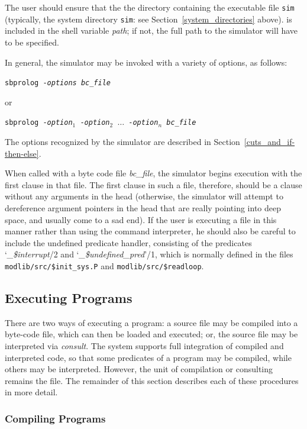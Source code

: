 The user should ensure that the the directory containing the executable file
{\tt sim}
(typically, the system directory {\tt sim}:
see Section~\ref{system_directories} above).
is included in the shell variable {\em path};
if not, the full path to the simulator will have to be specified.

In general, the simulator may be invoked with a variety of options, as
follows:
\begin{center}
{\tt sbprolog -{\em options} {\em bc\_file}}
\end{center}
or
\begin{center}
{\tt sbprolog -{\em option}$_1$~-{\em option}$_2$~$\ldots$ -{\em option}$_n$ {\em bc\_file}}
\end{center}
The options recognized by the simulator are described in
Section~\ref{cuts_and_if-then-else}.

When called with a byte code file {\em bc\_file}, the simulator begins
execution with the first clause in that file.
The first clause in such a file, therefore,
should be a clause without any arguments in the head
(otherwise, the simulator will attempt to dereference argument pointers
in the head that are really pointing into deep space,
and usually come to a sad end).
If the user is executing a file in this manner rather than using the
command interpreter, he should also be careful to include the undefined
predicate handler, consisting of the predicates `{\em \_\$interrupt}/2 and
`{\em \_\$undefined\_pred}'/1, which is normally defined in the files
{\tt modlib/src/\$init\_sys.P} and {\tt modlib/src/\$readloop}.

\subsection{Executing Programs}

There are two ways of executing a program: a source file may be compiled
into a byte-code file, which can then be loaded and executed;
or, the source file may be interpreted via {\em consult}.
The system supports full integration of compiled and interpreted code,
so that some predicates of a program may be compiled,
while others may be interpreted.
However, the unit of compilation or consulting remains the file.
The remainder of this section describes each of these procedures in more detail.

\subsubsection{Compiling Programs}

